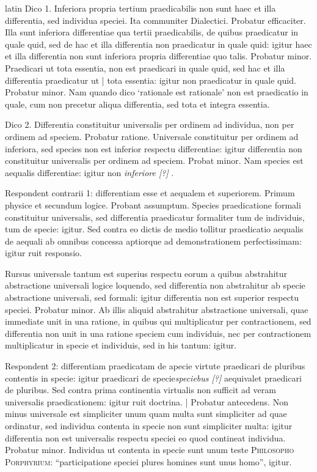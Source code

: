 \begin{otherlanguage*}{latin}
\pstart
 Dico 1. Inferiora propria tertium praedicabilis non sunt haec et illa differentia, sed individua speciei. Ita communiter Dialectici. Probatur efficaciter. Illa sunt inferiora differentiae qua tertii praedicabilis, de quibus praedicatur in quale quid, sed de hac et illa differentia non praedicatur in quale quid: igitur haec et illa differentia non sunt inferiora propria differentiae quo talis. Probatur minor. Praedicari ut tota essentia, non est praedicari in quale quid, sed hac et illa differentia praedicatur ut \textnormal{|}    tota essentia: igitur non praedicatur in quale quid. Probatur minor. Nam quando dico `rationale est rationale' non est praedicatio in quale, cum non precetur aliqua differentia, sed tota et integra essentia. 
\pend

\pstart
 Dico 2.  Differentia constituitur universalis per ordinem ad individua, non per ordinem ad speciem. Probatur ratione. Universale constituitur per ordinem ad inferiora, sed species non est inferior respectu differentiae: igitur differentia non constituitur universalis per ordinem ad speciem. Probat minor. Nam species est aequalis differentiae: igitur non \emph{inferiore [?]} . 
\pend

\pstart
 Respondent contrarii 1: differentiam esse et aequalem et superiorem. Primum physice et secundum logice. Probant assumptum. Species praedicatione formali constituitur universalis, sed differentia praedicatur formaliter tum de individuis, tum de specie: igitur. Sed contra eo dictis de medio tollitur praedicatio aequalis de aequali ab omnibus concessa aptiorque ad demonstrationem perfectissimam: igitur ruit responsio. 
\pend

\pstart
 Rursus universale tantum est superius respectu eorum a quibus abstrahitur abstractione universali logice loquendo, sed differentia non abstrahitur ab specie abstractione universali, sed formali: igitur differentia non est superior respectu speciei. Probatur minor. Ab illis aliquid abstrahitur abstractione universali, quae immediate unit in una ratione, in quibus qui multiplicatur per contractionem, sed differentia non unit in una ratione speciem cum individuis, nec per contractionem multiplicatur in specie et individuis, sed in his tantum: igitur. 
\pend

\pstart
 Respondent 2: differentiam praedicatam de apecie virtute praedicari de pluribus contentis in specie: igitur praedicari de specie\emph{speciebus [?]} aequivalet praedicari de pluribus. Sed contra prima continentia virtualis non sufficit ad veram universalis praedicationem: igitur ruit doctrina. \textnormal{|} Probatur antecedens. Non minus universale est simpliciter unum quam multa sunt simpliciter ad quae ordinatur, sed individua contenta in specie non sunt simpliciter multa: igitur differentia non est universalis respectu speciei eo quod contineat individua. Probatur minor. Individua ut contenta in specie sunt unum teste \textsc{Philosopho} \textsc{Porphyrium}: \enquote{participatione speciei plures homines sunt unus homo}, igitur. 
\pend


\end{otherlanguage*}
